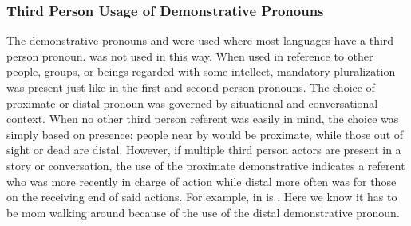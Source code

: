 \subsubsection{Third Person Usage of Demonstrative Pronouns}
The demonstrative pronouns \langsample{\proxdem} and \langsample{\distdem} were used where most languages have a third person pronoun. \langsample{\meddem} was not used in this way. When used in reference to other people, groups, or beings regarded with some intellect, mandatory pluralization was present just like in the first and second person pronouns. The choice of proximate or distal pronoun was governed by situational and conversational context. When no other third person referent was easily in mind, the choice was simply based on presence; people near by would be proximate, while those out of sight or dead are distal. However, if multiple third person actors are present in a story or conversation, the use of the proximate demonstrative indicates a referent who was more recently in charge of action while distal more often was for those on the receiving end of said actions. For example, in  is . Here we know it has to be mom walking around because of the use of the distal demonstrative pronoun.
